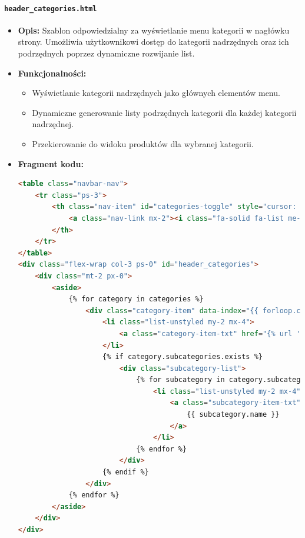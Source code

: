\documentclass[12pt,a4paper,oneside]{article}
\theoremstyle{definition}
\numberwithin{equation}{section}
\begin{document}
\paragraph{\texttt{header\_categories.html}}
\begin{itemize}
    \item \textbf{Opis:}
    Szablon odpowiedzialny za wyświetlanie menu kategorii w nagłówku strony. Umożliwia użytkownikowi dostęp do kategorii nadrzędnych oraz ich podrzędnych poprzez dynamiczne rozwijanie list.
    \item \textbf{Funkcjonalności:}
    \begin{itemize}
        \item Wyświetlanie kategorii nadrzędnych jako głównych elementów menu.
        \item Dynamiczne generowanie listy podrzędnych kategorii dla każdej kategorii nadrzędnej.
        \item Przekierowanie do widoku produktów dla wybranej kategorii.
    \end{itemize}
    \item \textbf{Fragment kodu:}
    \begin{lstlisting}[language=HTML, caption=Szablon header\_categories.html]
<table class="navbar-nav">
    <tr class="ps-3">
        <th class="nav-item" id="categories-toggle" style="cursor: pointer" aria-expanded="false" title="Categories">
            <a class="nav-link mx-2"><i class="fa-solid fa-list me-2"></i>Kategorie</a>
        </th>
    </tr>
</table>
<div class="flex-wrap col-3 ps-0" id="header_categories">
    <div class="mt-2 px-0">
        <aside>
            {% for category in categories %}
                <div class="category-item" data-index="{{ forloop.counter0 }}">
                    <li class="list-unstyled my-2 mx-4">
                        <a class="category-item-txt" href="{% url 'category_products' category.id %}">{{ category.name }}</a>
                    </li>
                    {% if category.subcategories.exists %}
                        <div class="subcategory-list">
                            {% for subcategory in category.subcategories.all %}
                                <li class="list-unstyled my-2 mx-4">
                                    <a class="subcategory-item-txt" href="{% url 'category_products' subcategory.id %}">
                                        {{ subcategory.name }}
                                    </a>
                                </li>
                            {% endfor %}
                        </div>
                    {% endif %}
                </div>
            {% endfor %}
        </aside>
    </div>
</div>
    \end{lstlisting}
\end{itemize}
\end{document}
